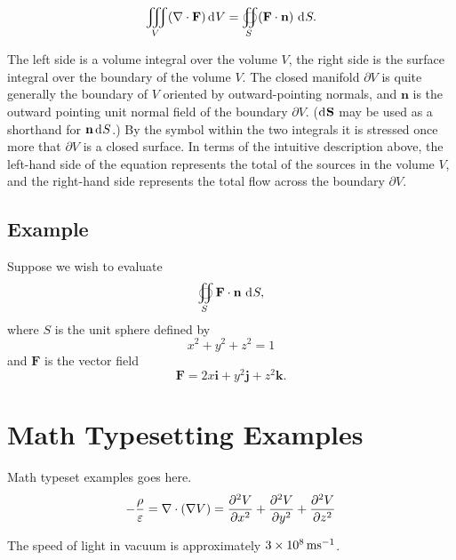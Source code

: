 \documentclass{cgdrepen}
\begin{document}
\begin{equation}
  \iiint_V(\mathbf{\nabla}\cdot\mathbf{F}) \diff V =
  \oiint_S(\mathbf{F}\cdot\mathbf{n})\,\diff S.
\end{equation}

The left side is a volume integral over the volume $V$,
the right side is the surface integral over the boundary of the volume $V$.
The closed manifold $\partial V$ is quite generally the boundary of $V$
oriented by outward-pointing normals, and $\mathbf{n}$ is the outward pointing 
unit normal field of the boundary $\partial V$. 
($\diff \mathbf{S}$ may be used as a shorthand for $\mathbf{n} \diff S$.)
By the symbol within the two integrals it is stressed once more that $\partial V$
is a closed surface.
In terms of the intuitive description above, the left-hand side of the 
equation represents the total of the sources in the volume $V$, 
and the right-hand side represents the total flow across the boundary $\partial V$.

\section{Example}

Suppose we wish to evaluate
\begin{equation}
  \oiint_S \mathbf{F}\cdot\mathbf{n} \, \diff S,
\end{equation}
where $S$ is the unit sphere defined by
\begin{equation}
   x^2+y^2+z^2=1
\end{equation}
and $\mathbf{F}$ is the vector field
\begin{equation}
  \mathbf{F} = 2 x\mathbf{i} + y^2\mathbf{j} + z ^2\mathbf{k}.
\end{equation}

\appendix
\chapter{Math Typesetting Examples}

Math typeset examples goes here.
\begin{equation}
  - \frac{\rho}{\varepsilon} = \nabla\cdot \left(\nabla V\right) = \pDeriv[2]{V}{x} + \pDeriv[2]{V}{y} + \pDeriv[2]{V}{z}
\end{equation}

The speed of light in vacuum is approximately $\unit[3\times10^8]{m s^{-1}}$.





\backmatter
\end{document}
